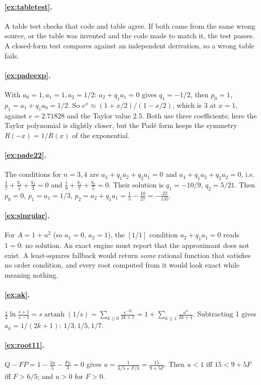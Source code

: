 \documentclass[11pt,a4paper,openany]{book}
\theoremstyle{definition}
\theoremstyle{plain}
\begin{document}
\paragraph{\ref{ex:tabletest}.} A table test checks that code and table agree. If both came from
the same wrong source, or the table was invented and the code made to match it, the test passes. A
closed-form test compares against an independent derivation, so a wrong table fails.

\paragraph{\ref{ex:padeexp}.} With $a_0=1,a_1=1,a_2=1/2$: $a_2+q_1a_1=0$ gives $q_1=-1/2$, then
$p_0=1$, $p_1=a_1+q_1a_0=1/2$. So $e^x\approx(1+x/2)/(1-x/2)$, which is $3$ at $x=1$, against
$e=2.71828$ and the Taylor value $2.5$. Both use three coefficients; here the Taylor polynomial is
slightly closer, but the Padé form keeps the symmetry $R(-x)=1/R(x)$ of the exponential.

\paragraph{\ref{ex:pade22}.} The conditions for $n=3,4$ are
$a_3+q_1a_2+q_2a_1=0$ and $a_4+q_1a_3+q_2a_2=0$, i.e.
$\frac17+\frac{q_1}5+\frac{q_2}3=0$ and $\frac19+\frac{q_1}7+\frac{q_2}5=0$. Their solution is
$q_1=-10/9$, $q_2=5/21$. Then $p_0=0$, $p_1=a_1=1/3$, $p_2=a_2+q_1a_1=\frac15-\frac{10}{27}
=-\frac{23}{135}$.

\paragraph{\ref{ex:singular}.} For $A=1+u^2$ (so $a_1=0$, $a_2=1$), the $[1/1]$ condition
$a_2+q_1a_1=0$ reads $1=0$: no solution. An exact engine must report that the approximant does not
exist. A least-squares fallback would return \emph{some} rational function that satisfies no order
condition, and every root computed from it would look exact while meaning nothing.

\paragraph{\ref{ex:ak}.} $\frac s2\ln\frac{s+1}{s-1}=s\operatorname{artanh}(1/s)
=\sum_{k\ge0}\frac{s^{-2k}}{2k+1}=1+\sum_{k\ge1}\frac{u^k}{2k+1}$. Subtracting 1 gives
$a_k=1/(2k+1)$: $1/3,1/5,1/7$.

\paragraph{\ref{ex:root11}.} $Q-FP=1-\frac{3u}5-\frac{Fu}3=0$ gives $u=\frac{1}{3/5+F/3}
=\frac{15}{9+5F}$. Then $u<1$ iff $15<9+5F$ iff $F>6/5$; and $u>0$ for $F>0$.
\end{document}
